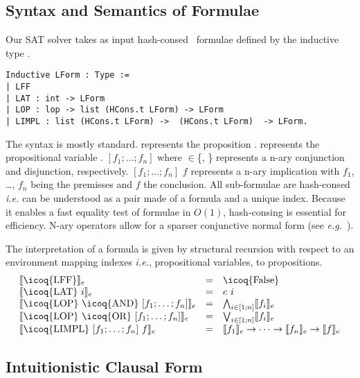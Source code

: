 \documentclass[a4paper,UKenglish,cleveref, autoref, thm-restate]{lipics-v2019}
\newcommand{\mcoq}[1]{\mbox{\icoq{#1}}}
\begin{document}
\subsection{Syntax and Semantics of Formulae}
\label{sec:syntax}
Our SAT solver takes as input hash-consed~\cite{Allen-hcons} formulae defined by the inductive type .
\begin{verbatim}
Inductive LForm : Type :=
| LFF
| LAT : int -> LForm
| LOP : lop -> list (HCons.t LForm) -> LForm
| LIMPL : list (HCons.t LForm) ->  (HCons.t LForm)  -> LForm.
\end{verbatim}
The syntax is mostly standard.
%
 represents the proposition . 
 represents the propositional variable .
%
 $[f_1; \dots; f_n]$ where  $\in$\{,
\} represents a n-ary conjunction and disjunction, respectively.
%
 $[f_1; \dots; f_n]$ $f$ represents a n-ary implication
with $f_1$, \dots, $f_n$ being the premisses and $f$ the conclusion.
%
All sub-formulae are hash-consed \emph{i.e.} 
can be understood as a pair made of a formula and a unique index.
%
Because it enables a fast equality test of formulae in $O(1)$, hash-consing is essential for efficiency.
%
N-ary operators allow for a sparser conjunctive normal form (see \emph{e.g.}~\cite{LescuyerC09}).

The interpretation of a formula  is given by structural recursion with respect
to an environment  mapping indexes \emph{i.e.}, propositional variables, to
propositions.
\[
  \begin{array}{lcl}
    \llbracket \mcoq{LFF} \rrbracket_e &=& \mcoq{False} \\
    \llbracket \mcoq{LAT}\ i \rrbracket_e &=& e\ i \\
    \llbracket \mcoq{LOP}\  \mcoq{AND}\ [f_1;\dots;f_n] \rrbracket_e &=& \bigwedge_{i\in [1;n]} \llbracket f_i \rrbracket_e \\
    \llbracket \mcoq{LOP}\  \mcoq{OR}\  [f_1;\dots;f_n] \rrbracket_e &=& \bigvee_{i\in [1;n]} \llbracket f_i \rrbracket_e \\
    \llbracket \mcoq{LIMPL}\ [f_1;\dots;f_n]\  f \rrbracket_e &=& \llbracket f_1\rrbracket_e \rightarrow \dots \rightarrow \llbracket f_n \rrbracket_e \to \llbracket f \rrbracket_e \\
  \end{array}
\]

\subsection{Intuitionistic Clausal Form}
\end{document}

